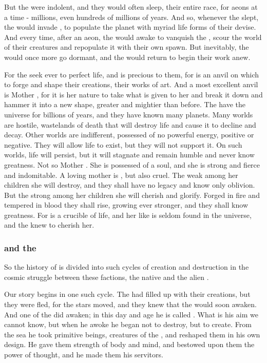 But the \krakens{} were indolent, and they would often sleep, their entire race, for aeons at a time - millions, even hundreds of millions of years. And so, whenever the \krakens{} slept, the \voyagers{} would invade \Miith{}, to populate the planet with myriad life forms of their devise. And every time, after an aeon, the \krakens{} would awake to vanquish the \voyagers{}, scour the world of their creatures and repopulate it with their own spawn. But inevitably, the \krakens{} would once more go dormant, and the \voyagers{} would return to begin their work anew. 

For the \voyagers{} seek ever to perfect life, and \Miith{} is precious to them, for \Miith{} is an anvil on which to forge and shape their creations, their works of art. And a most excellent anvil is Mother \Miith{}, for it is her nature to take what is given to her and break it down and hammer it into a new shape, greater and mightier than before. The \voyagers{} have \travelled the universe for billions of years, and they have known many planets. Many worlds are hostile, wastelands of death that will destroy life and cause it to decline and decay. Other worlds are indifferent, possessed of no powerful energy, positive or negative. They will allow life to exist, but they will not support it. On such worlds, life will persist, but it will stagnate and remain humble and never know greatness. Not so Mother \Miith{}. She is possessed of a soul, and she is strong and fierce and indomitable. A loving mother is \Miith{}, but also cruel. The weak among her children she will destroy, and they shall have no legacy 
and know only oblivion. But the strong among her children she will cherish and glorify. Forged in fire and tempered in blood they shall rise, growing ever stronger, and they shall know greatness. For \Miith{} is a crucible of life, and her like is seldom found in the universe, and the \voyagers{} knew to cherish her. 





\subsubsection{\Moroch{} and the \nagae}
So the history of \Miith{} is divided into such cycles of creation and destruction in the cosmic struggle between these factions, the native \krakens{} and the alien \voyagers{}. 

Our story begins in one such cycle. The \voyagers{} had filled \Miith{} up with their creations, but they were fled, for the stars moved, and they knew that the \krakens{} would soon awaken. And one of the \krakens{} did awaken; in this day and age he is called \Moroch{}. What is his aim we cannot know, but when he awoke he began not to destroy, but to create. From the sea he took primitive beings, creatures of the \voyagers{}, and reshaped them in his own design. He gave them strength of body and mind, and bestowed upon them the power of thought, and he made them his servitors. 

